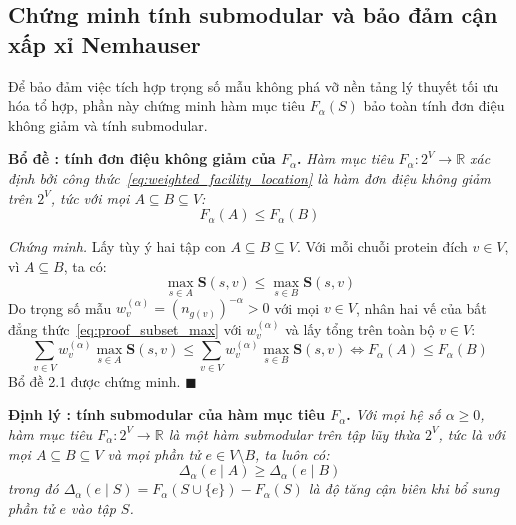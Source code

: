 \subsection{Chứng minh tính submodular và bảo đảm cận xấp xỉ Nemhauser}
\label{subsec:mathematical_proofs}

Để bảo đảm việc tích hợp trọng số mẫu không phá vỡ nền tảng lý thuyết tối ưu hóa tổ hợp, phần này chứng minh hàm mục tiêu $F_\alpha(S)$ bảo toàn tính đơn điệu không giảm và tính submodular.

\noindent{}\textbf{Bổ đề \thelemma: tính đơn điệu không giảm của $F_\alpha$.} \label{lem:monotonicity} \textit{Hàm mục tiêu $F_\alpha: 2^V \to \mathbb{R}$ xác định bởi công thức~\eqref{eq:weighted_facility_location} là hàm đơn điệu không giảm trên $2^V$, tức với mọi $A \subseteq B \subseteq V$:
\begin{equation}
F_\alpha(A) \le F_\alpha(B)
\end{equation}
}

\noindent\textit{Chứng minh.} Lấy tùy ý hai tập con $A \subseteq B \subseteq V$. Với mỗi chuỗi protein đích $v \in V$, vì $A \subseteq B$, ta có:
\begin{equation}
\label{eq:proof_subset_max}
\max_{s \in A} \mathbf{S}(s, v) \le \max_{s \in B} \mathbf{S}(s, v)
\end{equation}
Do trọng số mẫu $w_v^{(\alpha)} = (n_{g(v)})^{-\alpha} > 0$ với mọi $v \in V$, nhân hai vế của bất đẳng thức~\eqref{eq:proof_subset_max} với $w_v^{(\alpha)}$ và lấy tổng trên toàn bộ $v \in V$:
\begin{equation}
\sum_{v \in V} w_v^{(\alpha)} \max_{s \in A} \mathbf{S}(s, v) \le \sum_{v \in V} w_v^{(\alpha)} \max_{s \in B} \mathbf{S}(s, v) \iff F_\alpha(A) \le F_\alpha(B)
\end{equation}
Bổ đề 2.1 được chứng minh. \hfill $\blacksquare$

\noindent{}\textbf{Định lý \thetheorem: tính submodular của hàm mục tiêu $F_\alpha$.} \label{thm:submodularity} \textit{Với mọi hệ số $\alpha \ge 0$, hàm mục tiêu $F_\alpha: 2^V \to \mathbb{R}$ là một hàm submodular trên tập lũy thừa $2^V$, tức là với mọi $A \subseteq B \subseteq V$ và mọi phần tử $e \in V \setminus B$, ta luôn có:
\begin{equation}
\label{eq:theorem_submodularity}
\Delta_\alpha(e \mid A) \ge \Delta_\alpha(e \mid B)
\end{equation}
trong đó $\Delta_\alpha(e \mid S) = F_\alpha(S \cup \{e\}) - F_\alpha(S)$ là độ tăng cận biên khi bổ sung phần tử $e$ vào tập $S$.}


